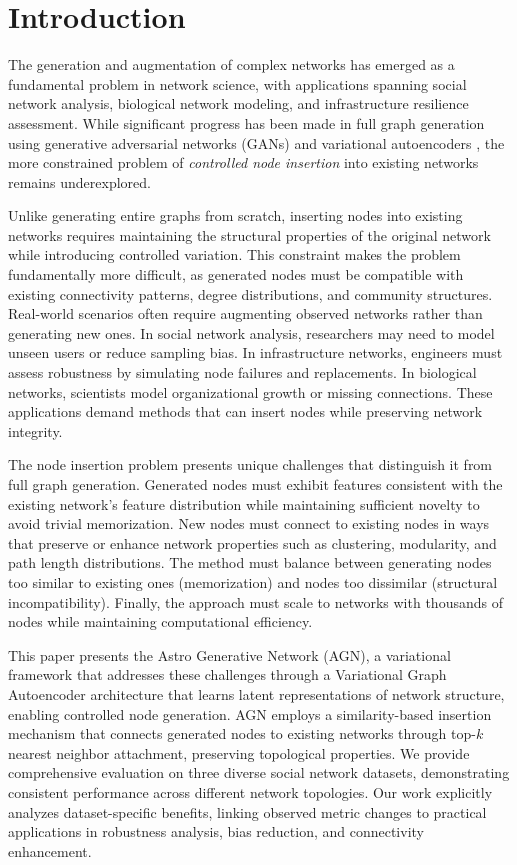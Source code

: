 \documentclass[12pt]{article}
\begin{document}
\section{Introduction}

The generation and augmentation of complex networks has emerged as a fundamental problem in network science, with applications spanning social network analysis, biological network modeling, and infrastructure resilience assessment. While significant progress has been made in full graph generation using generative adversarial networks (GANs) \cite{goodfellow2014generative} and variational autoencoders \cite{kingma2013auto}, the more constrained problem of \textit{controlled node insertion} into existing networks remains underexplored.

Unlike generating entire graphs from scratch, inserting nodes into existing networks requires maintaining the structural properties of the original network while introducing controlled variation. This constraint makes the problem fundamentally more difficult, as generated nodes must be compatible with existing connectivity patterns, degree distributions, and community structures. Real-world scenarios often require augmenting observed networks rather than generating new ones. In social network analysis, researchers may need to model unseen users or reduce sampling bias. In infrastructure networks, engineers must assess robustness by simulating node failures and replacements. In biological networks, scientists model organizational growth or missing connections. These applications demand methods that can insert nodes while preserving network integrity.

The node insertion problem presents unique challenges that distinguish it from full graph generation. Generated nodes must exhibit features consistent with the existing network's feature distribution while maintaining sufficient novelty to avoid trivial memorization. New nodes must connect to existing nodes in ways that preserve or enhance network properties such as clustering, modularity, and path length distributions. The method must balance between generating nodes too similar to existing ones (memorization) and nodes too dissimilar (structural incompatibility). Finally, the approach must scale to networks with thousands of nodes while maintaining computational efficiency.

This paper presents the Astro Generative Network (AGN), a variational framework that addresses these challenges through a Variational Graph Autoencoder architecture that learns latent representations of network structure, enabling controlled node generation. AGN employs a similarity-based insertion mechanism that connects generated nodes to existing networks through top-$k$ nearest neighbor attachment, preserving topological properties. We provide comprehensive evaluation on three diverse social network datasets, demonstrating consistent performance across different network topologies. Our work explicitly analyzes dataset-specific benefits, linking observed metric changes to practical applications in robustness analysis, bias reduction, and connectivity enhancement.
\end{document}
